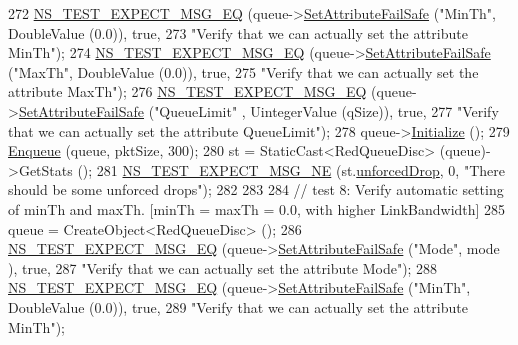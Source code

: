 \begin{DoxyCode}
272   \hyperlink{group__testing_ga7304ba46a28d8cf08dfdfd6499cf7068}{NS\_TEST\_EXPECT\_MSG\_EQ} (queue->\hyperlink{classns3_1_1ObjectBase_aa7d333004e970f925a4ed5df275541b5}{SetAttributeFailSafe} (\textcolor{stringliteral}{"MinTh"}, 
      DoubleValue (0.0)), \textcolor{keyword}{true},
273                          \textcolor{stringliteral}{"Verify that we can actually set the attribute MinTh"});
274   \hyperlink{group__testing_ga7304ba46a28d8cf08dfdfd6499cf7068}{NS\_TEST\_EXPECT\_MSG\_EQ} (queue->\hyperlink{classns3_1_1ObjectBase_aa7d333004e970f925a4ed5df275541b5}{SetAttributeFailSafe} (\textcolor{stringliteral}{"MaxTh"}, 
      DoubleValue (0.0)), \textcolor{keyword}{true},
275                          \textcolor{stringliteral}{"Verify that we can actually set the attribute MaxTh"});
276   \hyperlink{group__testing_ga7304ba46a28d8cf08dfdfd6499cf7068}{NS\_TEST\_EXPECT\_MSG\_EQ} (queue->\hyperlink{classns3_1_1ObjectBase_aa7d333004e970f925a4ed5df275541b5}{SetAttributeFailSafe} (\textcolor{stringliteral}{"QueueLimit"}
      , UintegerValue (qSize)), \textcolor{keyword}{true},
277                          \textcolor{stringliteral}{"Verify that we can actually set the attribute QueueLimit"});
278   queue->\hyperlink{classns3_1_1Object_af4411cb29971772fcd09203474a95078}{Initialize} ();
279   \hyperlink{classAredQueueDiscTestCase_a5528c44233e1056913e76d5be988f049}{Enqueue} (queue, pktSize, 300);
280   st = StaticCast<RedQueueDisc> (queue)->GetStats ();
281   \hyperlink{group__testing_ga6d4b162d26b8a930115b97dd5f3d9ed9}{NS\_TEST\_EXPECT\_MSG\_NE} (st.\hyperlink{structns3_1_1RedQueueDisc_1_1Stats_a242027f6eb7d30e2cd636c52080e2c73}{unforcedDrop}, 0, \textcolor{stringliteral}{"There should be some
       unforced drops"});
282 
283 
284   \textcolor{comment}{// test 8: Verify automatic setting of minTh and maxTh. [minTh = maxTh = 0.0, with higher LinkBandwidth]}
285   queue = CreateObject<RedQueueDisc> ();
286   \hyperlink{group__testing_ga7304ba46a28d8cf08dfdfd6499cf7068}{NS\_TEST\_EXPECT\_MSG\_EQ} (queue->\hyperlink{classns3_1_1ObjectBase_aa7d333004e970f925a4ed5df275541b5}{SetAttributeFailSafe} (\textcolor{stringliteral}{"Mode"}, mode
      ), \textcolor{keyword}{true},
287                          \textcolor{stringliteral}{"Verify that we can actually set the attribute Mode"});
288   \hyperlink{group__testing_ga7304ba46a28d8cf08dfdfd6499cf7068}{NS\_TEST\_EXPECT\_MSG\_EQ} (queue->\hyperlink{classns3_1_1ObjectBase_aa7d333004e970f925a4ed5df275541b5}{SetAttributeFailSafe} (\textcolor{stringliteral}{"MinTh"}, 
      DoubleValue (0.0)), \textcolor{keyword}{true},
289                          \textcolor{stringliteral}{"Verify that we can actually set the attribute MinTh"});

\end{DoxyCode}
